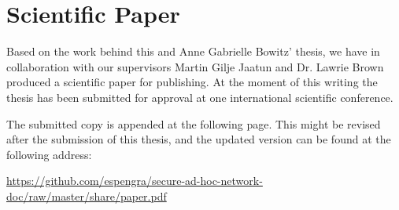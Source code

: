 \chapter{Scientific Paper}
\label{appendix:paper}
\acresetall

Based on the work behind this and Anne Gabrielle Bowitz' thesis, we have in
collaboration with our supervisors Martin Gilje Jaatun and Dr. Lawrie Brown
produced a scientific paper for publishing. At the moment of this writing the
thesis has been submitted for approval at one international scientific
conference.

The submitted copy is appended at the following page. This might be revised
after the submission of this thesis, and the updated version can be found at the
following address:

\url{https://github.com/espengra/secure-ad-hoc-network-doc/raw/master/share/paper.pdf}

